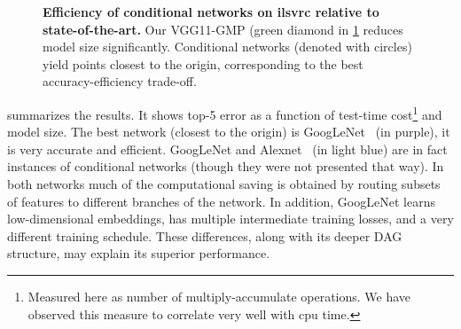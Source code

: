 \documentclass[thesis]{subfiles}
\begin{document}
\begin{figure}[tbp]
\begin{subfigure}[b]{0.98\linewidth}
			\centering
		\end{subfigure}
		\caption[Efficiency of conditional networks on \gls{ilsvrc} relative to state-of-the-art]{\textbf{Efficiency of conditional networks on \gls{ilsvrc} relative to state-of-the-art.} Our VGG11-GMP (green diamond in \cref{fig:Imagenet_results} reduces model size significantly. Conditional networks (denoted with circles) yield points closest to the origin, corresponding to the best accuracy-efficiency trade-off.}\label{fig:Imagenet_results}
	\end{figure}

	 summarizes the results.
	It shows top-5 error as a function of test-time 
	cost\footnote{Measured here as number of multiply-accumulate operations. We have observed this measure 
		to correlate very well with \gls{cpu} time.} and model size. 
	The best network (closest to the origin) is GoogLeNet~\citep{Szegedy2014going} (in purple), it is very accurate and efficient. 
	GoogLeNet and Alexnet~\citep{Krizhevsky2012} (in light blue) are in fact instances of conditional networks 
	(though they were not presented that way). In both networks much of the computational saving is obtained by routing
	subsets of features to different branches of the network.
	In addition, GoogLeNet learns low-dimensional embeddings, has multiple intermediate training losses, and a very 
	different training schedule. These differences, along with its deeper DAG structure, may explain its superior performance.
	
\end{document}
